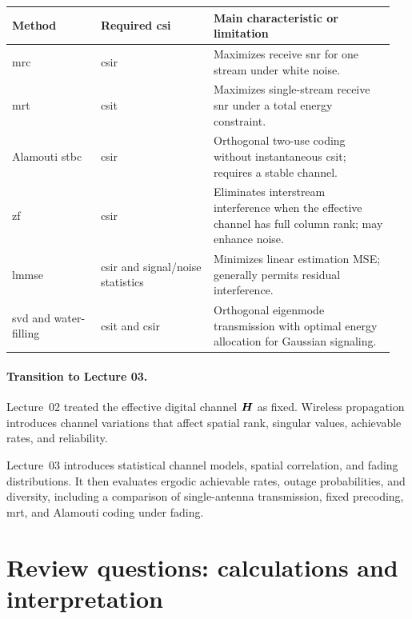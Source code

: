 \begin{center}
	\small
	\begin{tabular}{@{}p{0.22\linewidth}
			p{0.28\linewidth}
			p{0.45\linewidth}@{}}
		\toprule
		Method & Required \ac{csi} & Main characteristic or limitation\\
		\midrule
		\acs{mrc}
		& \ac{csir}
		& Maximizes receive \ac{snr} for one stream under
		white noise.\\
		
		\acs{mrt}
		& \ac{csit}
		& Maximizes single-stream receive \ac{snr}
		under a total energy constraint.\\
		
		Alamouti \acs{stbc}
		& \ac{csir}
		& Orthogonal two-use coding without instantaneous
		\ac{csit}; requires a stable channel.\\
		
		\acs{zf}
		& \ac{csir}
		& Eliminates interstream interference when the
		effective channel has full column rank;
		may enhance noise.\\
		
		\acs{lmmse}
		& \ac{csir} and signal/noise statistics
		& Minimizes linear estimation MSE;
		generally permits residual interference.\\
		
		\acs{svd} and water-filling
		& \ac{csit} and \ac{csir}
		& Orthogonal eigenmode transmission with
		optimal energy allocation for Gaussian signaling.\\
		\bottomrule
	\end{tabular}
\end{center}

\paragraph{Transition to Lecture 03.}
Lecture~02 treated the effective digital channel $\bm{H}$
as fixed. Wireless propagation introduces channel variations
that affect spatial rank, singular values, achievable rates,
and reliability.

Lecture~03 introduces statistical channel models,
spatial correlation, and fading distributions.
It then evaluates ergodic achievable rates, outage
probabilities, and diversity, including a comparison
of single-antenna transmission, fixed precoding,
\ac{mrt}, and Alamouti coding under fading.

\appendix
\clearpage

\section{Review questions: calculations and interpretation}

